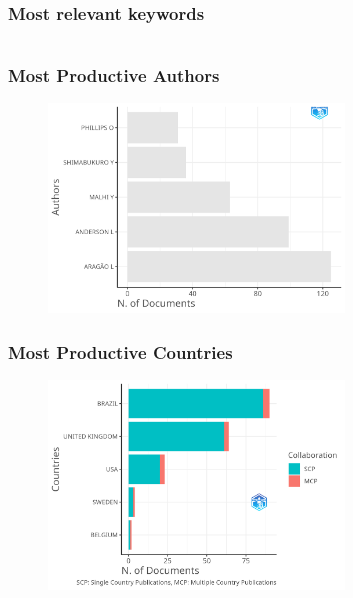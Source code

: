 \documentclass[aspectratio=169]{beamer}
\begin{document}
\begin{frame}
	\frametitle{Most relevant keywords}
	\begin{columns}
		\begin{column}{0.5\textwidth}
			\centering
			\scriptsize
			
		\end{column}
		\begin{column}{0.5\textwidth}
			\centering
			\scriptsize
			
		\end{column}
	\end{columns}
\end{frame}

\begin{frame}
	\frametitle{Most Productive Authors}
	\begin{figure}
		\centering
		\includegraphics[width=0.7\textwidth]{figures/MostProdAuthors.png}
	\end{figure}
\end{frame}

\begin{frame}
	\frametitle{Most Productive Countries}
	\begin{figure}
		\centering
		\includegraphics[width=0.7\textwidth]{figures/MostProdCountries.png}
	\end{figure}
\end{frame}
\end{document}
